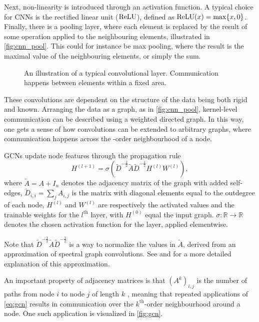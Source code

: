 Next, non-linearity is introduced through an activation function.
A typical choice for CNNs is the rectified linear unit ($\operatorname{ReLU}$), defined as $\operatorname{ReLU}(x) = \max\{x, 0\}$.
Finally, there is a pooling layer, where each element is replaced by the result of some operation applied to the neighbouring elements, illustrated in \autoref{fig:cnn_pool}.
This could for instance be max pooling, where the result is the maximal value of the neighbouring elements, or simply the sum.

\begin{figure}[!h]
    \centering
    \resizebox{!}{4cm}{}
    \caption{An illustration of a typical convolutional layer. Communication happens between elements within a fixed area.}
    \label{fig:cnn_pool}
\end{figure}

These convolutions are dependent on the structure of the data being both rigid and known.
Arranging the data as a graph, as in \autoref{fig:cnn_pool}, kernel-level communication can be described using a weighted directed graph.
In this way, one gets a sense of how convolutions can be extended to arbitrary graphs, where communication happens across the -order neighbourhood of a node.

GCNs update node features through the propagation rule
\begin{equation}\label{eq:gcn}
    H^{(l+1)} = \sigma \left( \tilde{D}^{-\frac{1}{2}} \tilde{A} \tilde{D}^{-\frac{1}{2}} H^{(l)} W^{(l)} \right),
\end{equation}
where $\tilde{A} = A + I_n$ denotes the adjacency matrix of the graph with added self-edges, $\tilde{D}_{i,i} = \sum_j A_{i,j}$ is the matrix with diagonal elements equal to the outdegree of each node, $H^{(l)}$ and $W^{(l)}$ are respectively the activated values and the trainable weights for the $l^{\text{th}}$ layer, with $H^{(0)}$ equal the input graph.
$\sigma : \mathbb{R} \to \mathbb{R}$ denotes the chosen activation function for the layer, applied elementwise.

Note that $\tilde{D}^{-\frac{1}{2}} \tilde{A} \tilde{D}^{-\frac{1}{2}}$ is a way to normalize the values in $\tilde{A}$, derived from an approximation of spectral graph convolutions.
See \textcite{kipf2017semisupervised} and \textcite{spectralGraph} for a more detailed explanation of this approximation.

An important property of adjacency matrices is that $(A^k)_{i,j}$ is the number of paths from node $i$ to node $j$ of length $k$ \cite[p.~125]{aigner2023discrete}, meaning that repeated applications of \eqref{eq:gcn} results in communication over the $k^{\text{th}}$-order neighbourhood around a node.
One such application is visualized in \autoref{fig:gcn}.

